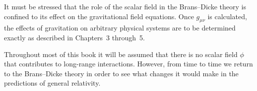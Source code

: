 It must be stressed that the role of the scalar field in the Brans--Dicke
theory is confined to its effect on the gravitational field equations. Once
\(g_{\mu\nu}\) is calculated, the effects of gravitation on arbitrary
physical systems are to be determined exactly as described in Chapters~3
through~5.

Throughout most of this book it will be assumed that there is no scalar field
\(\phi\) that contributes to long-range interactions. However, from time to
time we return to the Brans--Dicke theory in order to see what changes it
would make in the predictions of general relativity.
